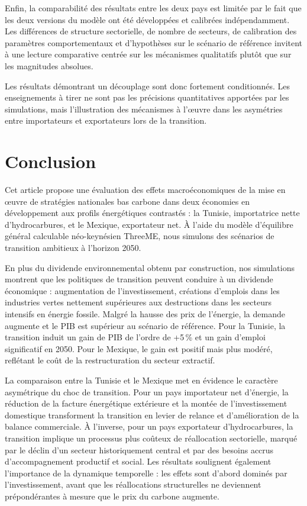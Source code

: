 \documentclass[12pt, a4paper]{article}
\begin{document}
Enfin, la comparabilité des résultats entre les deux pays est limitée par le fait que les deux versions du modèle ont été développées et calibrées indépendamment. Les différences de structure sectorielle, de nombre de secteurs, de calibration des paramètres comportementaux et d'hypothèses sur le scénario de référence invitent à une lecture comparative centrée sur les mécanismes qualitatifs plutôt que sur les magnitudes absolues.

Les résultats démontrant un découplage sont donc fortement conditionnés. Les enseignements à tirer ne sont pas les précisions quantitatives apportées par les simulations, mais l'illustration des mécanismes à l'\oe{}uvre dans les asymétries entre importateurs et exportateurs lors de la transition.

\section{Conclusion}
\label{sec:conclusion}

Cet article propose une évaluation des effets macroéconomiques de la mise en \oe{}uvre de stratégies nationales bas carbone dans deux économies en développement aux profils énergétiques contrastés : la Tunisie, importatrice nette d'hydrocarbures, et le Mexique, exportateur net. À l'aide du modèle d'équilibre général calculable néo-keynésien ThreeME, nous simulons des scénarios de transition ambitieux à l'horizon 2050.

En plus du dividende environnemental obtenu par construction, nos simulations montrent que les politiques de transition peuvent conduire à un dividende économique : augmentation de l'investissement, créations d'emplois dans les industries vertes nettement supérieures aux destructions dans les secteurs intensifs en énergie fossile. Malgré la hausse des prix de l'énergie, la demande augmente et le PIB est supérieur au scénario de référence. Pour la Tunisie, la transition induit un gain de PIB de l'ordre de +5\,\% et un gain d'emploi significatif en 2050. Pour le Mexique, le gain est positif mais plus modéré, reflétant le coût de la restructuration du secteur extractif.

La comparaison entre la Tunisie et le Mexique met en évidence le caractère asymétrique du choc de transition. Pour un pays importateur net d'énergie, la réduction de la facture énergétique extérieure et la montée de l'investissement domestique transforment la transition en levier de relance et d'amélioration de la balance commerciale. À l'inverse, pour un pays exportateur d'hydrocarbures, la transition implique un processus plus coûteux de réallocation sectorielle, marqué par le déclin d'un secteur historiquement central et par des besoins accrus d'accompagnement productif et social. Les résultats soulignent également l'importance de la dynamique temporelle : les effets sont d'abord dominés par l'investissement, avant que les réallocations structurelles ne deviennent prépondérantes à mesure que le prix du carbone augmente.
\end{document}

